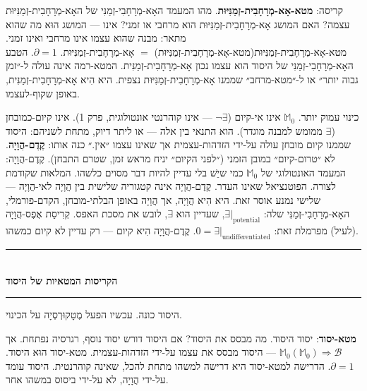 \documentclass[10pt, openany, oneside]{book}
\renewcommand{\normalsize}{\fontsize{10}{13}\selectfont}
\begin{document}
קריסה: \textbf{מטא-אָא-מְרָחָבִית-זְמַנִּיּוּת}. מהו המעמד האָא-מְרָחָבִי-זְמַנִּי של האָא-מְרָחָבִית-זְמַנִּיּוּת עצמה? האם המושג אָא-מְרָחָבִית-זְמַנִּיּוּת הוא מרחבי או זמני? אינו — המושג הוּא מה שהוא מתאר: מבנה שהוא עצמו אינו מרחבי ואינו זמני. מטא-אָא-מְרָחָבִית-זְמַנִּיּוּת(מטא-אָא-מְרָחָבִית-זְמַנִּיּוּת) $=$ אָא-מְרָחָבִית-זְמַנִּיּוּת. $\partial = 1$. הטבע האָא-מְרָחָבִי-זְמַנִּי של היסוד הוא עצמו נכון אָא-מְרָחָבִית-זְמַנִּית. המטא-רמה אינה עולה ל-״זמן גבוה יותר״ או ל-״מטא-מרחב״ שממנו אָא-מְרָחָבִית-זְמַנִּיּוּת נצפית. היא הִיא אָא-מְרָחָבִית-זְמַנִּית, באופן שקוף-לעצמו.

כינוי עמוק יותר. $\mathbb{M}_0$ אינו אי-קיום ($\neg\exists$ — אינו קוהרנטי אונטולוגית, פרק 1). אינו קיום-כמובחן ($\exists$ ממומש למבנה מוגדר). הוא התנאי בין אלה — או ליתר דיוק, מתחת לשניהם: היסוד שממנו קיום מובחן עולה על-ידי הזדהות-עצמית אך שאינו עצמו ״אין.״ כנה אותו: \textbf{קֶדֶם-הֲוָיָה}. לא ״טרום-קיום״ במובן הזמני (״לפני הקיום״ יניח מראש זמן, שטרם התבחן). קֶדֶם-הֲוָיָה: המעמד האונטולוגי של $\mathbb{M}_0$ כמי שיֵשׁ בלי עדיין להיות דבר מסוים כלשהו. המלאות שקודמת לצורה. הפוטנציאל שאינו העדר. קֶדֶם-הֲוָיָה אינה קטגוריה שלישית בין הֲוָיָה לאי-הֲוָיָה — שלישי נמנע אוסר זאת. היא הִיא הֲוָיָה, אך הֲוָיָה באופן הבלתי-מובחן, הקדם-פורמלי, האָא-מְרָחָבִי-זְמַנִּי שלה: $\exists|_{\text{potential}}$, שעדיין הוא $\exists$, לובש את מסכת האפס. קְרִיסַת אֶפֶס-הֲוָיָה (לעיל) מפרמלת זאת: $0 = \exists|_{\text{undifferentiated}}$. קֶדֶם-הֲוָיָה הִיא קיום — רק עדיין לא קיום כמשהו.

\vspace{1.5em}


\begin{center}
    \rule{0.3\textwidth}{0.4pt}\\[0.5em]
    {\normalsize\bfseries\textsc{הקריסות המטאיות של היסוד}}\\[0.3em]
    \rule{0.3\textwidth}{0.4pt}
\end{center}

\vspace{1em}

\noindent היסוד כונה. עכשיו הפעל מֶטָקוּרְסְיָה על הכינוי.

\textbf{מטא-יסוד}: יסוד היסוד. מה מבסס את היסוד? אם היסוד דורש יסוד נוסף, רגרסיה נפתחת. אך $\mathbb{M}_0(\mathbb{M}_0) \Rightarrow \mathcal{B}$ — היסוד מבסס את עצמו על-ידי הזדהות-עצמית. מטא-יסוד הוּא היסוד. $\partial = 1$. הדרישה למטא-יסוד היא דרישה למשהו מתחת להכל, שאינה קוהרנטית. היסוד עומד על-ידי הֲוָיָה, לא על-ידי ביסוס במשהו אחר.
\end{document}
